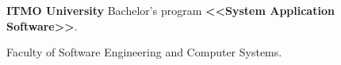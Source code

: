 
\vspace{0.8em}
\begin{scholarship}
     {\textbf {ITMO University} \newline
     Bachelor's program \textbf {<<System Application Software>>}.

     Faculty of Software Engineering and Computer Systems.}
\end{scholarship}
